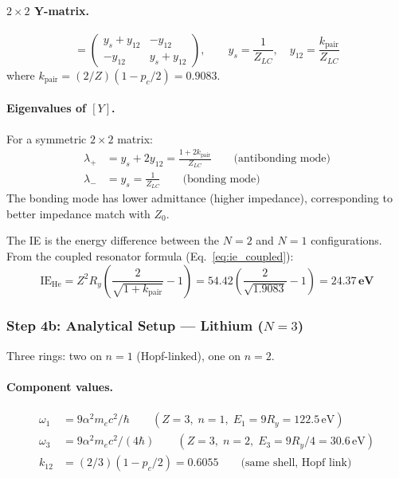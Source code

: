 \paragraph{$2 \times 2$ Y-matrix.}
\begin{equation}
    [Y] = \begin{pmatrix}
    y_s + y_{12} & -y_{12} \\
    -y_{12}      & y_s + y_{12}
    \end{pmatrix}, \qquad
    y_s = \frac{1}{Z_{LC}}, \quad
    y_{12} = \frac{k_{\text{pair}}}{Z_{LC}}
\end{equation}
where $k_{\text{pair}} = (2/Z)(1 - p_c/2) = 0.9083$.

\paragraph{Eigenvalues of $[Y]$.}
For a symmetric $2\times 2$ matrix:
\begin{align}
    \lambda_+ &= y_s + 2y_{12} = \frac{1 + 2k_{\text{pair}}}{Z_{LC}}
    \qquad \text{(antibonding mode)} \\
    \lambda_- &= y_s = \frac{1}{Z_{LC}}
    \qquad \text{(bonding mode)}
\end{align}
The bonding mode has lower admittance (higher impedance),
corresponding to better impedance match with $Z_0$.

The IE is the energy difference between the $N=2$
and $N=1$ configurations. From the coupled resonator
formula (Eq.~\ref{eq:ie_coupled}):
\begin{equation}
    \text{IE}_{\text{He}} = Z^2 R_y
    \left(\frac{2}{\sqrt{1 + k_{\text{pair}}}} - 1\right)
    = 54.42 \left(\frac{2}{\sqrt{1.9083}} - 1\right)
    = \mathbf{24.37\,\text{eV}}
\end{equation}

\subsubsection{Step 4b: Analytical Setup --- Lithium ($N=3$)}

Three rings: two on $n=1$ (Hopf-linked), one on $n=2$.

\paragraph{Component values.}
\begin{align}
    \omega_1 &= 9\alpha^2 m_e c^2/\hbar
    \qquad (Z=3,\; n=1,\; E_1 = 9 R_y = 122.5\,\text{eV}) \\
    \omega_3 &= 9\alpha^2 m_e c^2/(4\hbar)
    \qquad (Z=3,\; n=2,\; E_3 = 9 R_y/4 = 30.6\,\text{eV}) \\
    k_{12} &= (2/3)(1 - p_c/2) = 0.6055
    \qquad \text{(same shell, Hopf link)}
\end{align}

